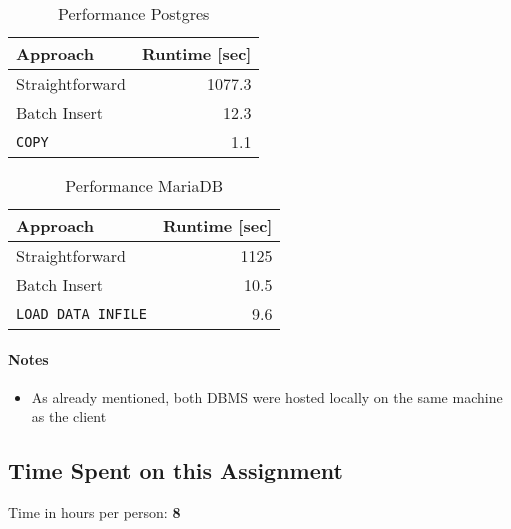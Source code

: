 \documentclass[11pt]{scrartcl}
\begin{document}
\begin{multicols}{2}
  \begin{table}[H]
    \centering
    \begin{tabular}{l|r}
      \toprule
      Approach          & Runtime [sec] \tabularnewline
      \hline
      Straightforward   & 1077.3 \tabularnewline
      Batch Insert & 12.3 \tabularnewline
      \texttt{COPY} & 1.1 \tabularnewline
      \bottomrule
    \end{tabular}
    \caption{Performance Postgres}
    \label{table:performance_postgres}
  \end{table}

  \columnbreak

  \begin{table}[H]
    \centering
    \begin{tabular}{l|r}
      \toprule
      Approach          & Runtime [sec] \tabularnewline
      \hline
      Straightforward   & 1125 \tabularnewline
      Batch Insert & 10.5 \tabularnewline
      \texttt{LOAD DATA INFILE} & 9.6 \tabularnewline
      \bottomrule
    \end{tabular}
    \caption{Performance MariaDB}
    \label{table:performance_mariadb}
  \end{table}
\end{multicols}

\paragraph{Notes}

\begin{itemize}
  \item As already mentioned, both DBMS were hosted locally on the same machine as the client
\end{itemize}

\subsection*{Time Spent on this Assignment}

Time in hours per person: \textbf{8}

\pagebreak

\printbibliography[title=References]
\end{document}
